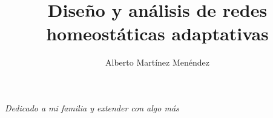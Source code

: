 \documentclass[a4paper,12pt,twoside,hidelinks,openright]{report}
\begin{document}
\title{Diseño y análisis de redes homeostáticas adaptativas}
\author{Alberto Martínez Menéndez}

\pagebreak
\cleardoublepage
\baselineskip 19pt

\renewcommand{\labelitemi}{$-$}
\renewcommand{\tablename}{Tabla}

\renewcommand{\appendixname}{Anexos}
\renewcommand{\appendixtocname}{Anexos}
\renewcommand{\appendixpagename}{Anexos}





\cleardoublepage

\newpage
\begin{flushright}
\textit{Dedicado a mi familia y extender con algo más}
\end{flushright}
\cleardoublepage


\newpage


\newpage
\cleardoublepage

\newpage


\cleardoublepage
\renewcommand{\contentsname}{Índice}
\tableofcontents

\newpage
\renewcommand\listfigurename{Lista de Figuras}
\listoffigures

\newpage
\renewcommand\listtablename{Lista de Tablas}
\listoftables





% 
\end{document}
